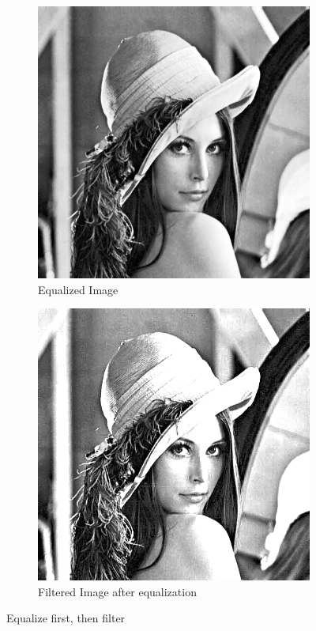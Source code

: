 \documentclass[11pt]{article}
\begin{document}
\begin{figure}[h]
\centering
\begin{subfigure}{.5\textwidth}
  \centering
  \includegraphics[width=.8\linewidth]{eq.png}
  \caption{Equalized Image}
  \label{fig:eq}
\end{subfigure}%
\begin{subfigure}{.5\textwidth}
  \centering
  \includegraphics[width=.8\linewidth]{eqFilter.png}
  \caption{Filtered Image after equalization}
  \label{fig:eqFilter}
\end{subfigure}
\caption{Equalize first, then filter}
\label{fig:EqFilter}
\end{figure}
\end{document}
